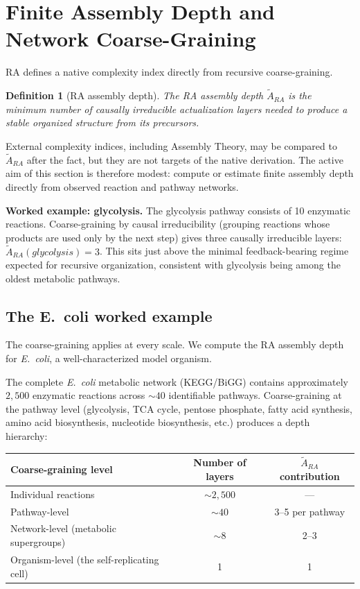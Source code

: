 \documentclass[11pt]{article}
\def\mathrm#1{#1}%
\def\text#1{#1}%
\newtheorem{definition}{Definition}
\begin{document}
\section{Finite Assembly Depth and Network Coarse-Graining}
\label{sec:assembly}

RA defines a native complexity index directly from recursive coarse-graining.

\begin{definition}[RA assembly depth]
The RA assembly depth $\tilde{A}_{\mathrm{RA}}$ is the minimum number of causally irreducible actualization layers needed to produce a stable organized structure from its precursors.
\end{definition}

External complexity indices, including Assembly Theory, may be compared to $\tilde{A}_{\mathrm{RA}}$ after the fact, but they are not targets of the native derivation. The active aim of this section is therefore modest: compute or estimate finite assembly depth directly from observed reaction and pathway networks.

\textbf{Worked example: glycolysis.} The glycolysis pathway consists of 10 enzymatic reactions. Coarse-graining by causal irreducibility (grouping reactions whose products are used only by the next step) gives three causally irreducible layers: $\tilde{A}_{\mathrm{RA}}(\text{glycolysis})=3$. This sits just above the minimal feedback-bearing regime expected for recursive organization, consistent with glycolysis being among the oldest metabolic pathways.

\subsection{The E.~coli worked example}
\label{sec:ecoli}

The coarse-graining applies at every scale. We compute the RA assembly depth for \emph{E.~coli}, a well-characterized model organism.

The complete \emph{E.~coli} metabolic network (KEGG/BiGG) contains approximately $2{,}500$ enzymatic reactions across $\sim 40$ identifiable pathways. Coarse-graining at the pathway level (glycolysis, TCA cycle, pentose phosphate, fatty acid synthesis, amino acid biosynthesis, nucleotide biosynthesis, etc.) produces a depth hierarchy:

\begin{center}
\begin{tabular}{lcc}
\toprule
Coarse-graining level & Number of layers & $\tilde{A}_{\mathrm{RA}}$ contribution \\
\midrule
Individual reactions & $\sim 2{,}500$ & --- \\
Pathway-level & $\sim 40$ & 3--5 per pathway \\
Network-level (metabolic supergroups) & $\sim 8$ & 2--3 \\
Organism-level (the self-replicating cell) & 1 & 1 \\
\bottomrule
\end{tabular}
\end{center}
\end{document}
